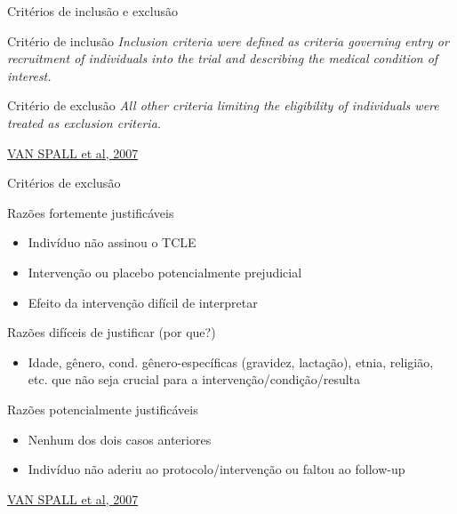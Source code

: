 \documentclass{beamer}
\begin{document}
\begin{frame}{Critérios de inclusão e exclusão}
  \begin{block}{Critério de inclusão}
    \footnotesize
    {\em Inclusion criteria were defined as criteria governing entry or
    recruitment of individuals into the trial and describing the
    medical condition of interest.}
  \end{block}
  \begin{block}{Critério de exclusão}
    \footnotesize
    {\em All other criteria limiting the eligibility of individuals were
    treated as exclusion criteria.}
  \end{block}

  \vfill
  \scriptsize
  \hfill \href{https://doi.org/10.1001/jama.297.11.1233}{VAN SPALL et al, 2007}
\end{frame}

\begin{frame}{Critérios de exclusão}
  \begin{block}{Razões fortemente justificáveis}
    \begin{itemize}
      \footnotesize
    \item Indivíduo não assinou o TCLE
    \item Intervenção ou placebo potencialmente prejudicial
    \item Efeito da intervenção difícil de interpretar
    \end{itemize}
  \end{block}
  \pause
  \begin{block}{Razões difíceis de justificar (por que?)}
    \small
    \begin{itemize}
    \item Idade, gênero, cond. gênero-específicas (gravidez, lactação), etnia, religião, etc. que não seja crucial para a intervenção/condição/resulta
    \end{itemize}
  \end{block}
  \pause
  \begin{block}{Razões potencialmente justificáveis}
    \small
    \begin{itemize}
    \item Nenhum dos dois casos anteriores
    \item Indivíduo não aderiu ao protocolo/intervenção ou faltou ao follow-up
    \end{itemize}
  \end{block}

  \vfill
  \scriptsize
  \hfill \href{https://doi.org/10.1001/jama.297.11.1233}{VAN SPALL et al, 2007}
\end{frame}
\end{document}
